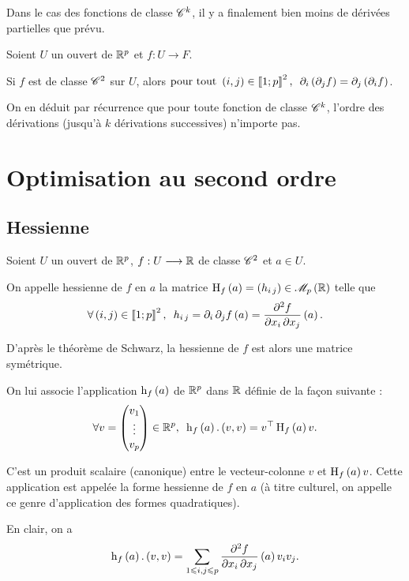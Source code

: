 Dans le cas des fonctions de classe \(\mathscr{C}^{k}\), il y a finalement bien moins de dérivées partielles que prévu.

\begin{theo}
Soient \(U\) un ouvert de \(\mathbb{R}^p\) et \(f:U\to F\).

Si \(f\) est de classe \(\mathscr{C}^{2}\) sur \(U\), alors \(\quantifs{\tpt\paren{i,j}\in\interventierii{1}{p}^2}\pdif{i}\paren{\pdif{j}f}=\pdif{j}\paren{\pdif{i}f}\).
\end{theo}

On en déduit par récurrence que pour toute fonction de classe \(\mathscr{C}^{k}\), l'ordre des dérivations (jusqu'à \(k\) dérivations successives) n'importe pas.

\section{Optimisation au second ordre}

\subsection{Hessienne}

\begin{defi}
Soient \(U\) un ouvert de \(\mathbb{R}^p\), \(f:U\longrightarrow\mathbb{R}\) de classe \(\mathscr{C}^{2}\) et \(a\in U\).

On appelle hessienne de \(f\) en \(a\) la matrice \(\hessienne{f}\paren{a}=\paren{h_{i\,j}}\in\M{p}[\R]\) telle que \[\quantifs{\forall\paren{i,j}\in\interventierii{1}{p}^2}h_{i\,j}=\pdif{i}\pdif{j}f\paren{a}=\pdv{f}{x_i,x_j}\paren{a}.\]
\end{defi}

D'après le théorème de Schwarz, la hessienne de \(f\) est alors une matrice symétrique.


On lui associe l'application \(\operatorname{h}_{f}\left(a\right)\) de \(\mathbb{R}^p\) dans \(\mathbb{R}\) définie de la façon suivante : \[\quantifs{\forall v=\tcoords{v_1}{\vdots}{v_p}\in\R^p}\formehessienne{f}\paren{a}.\paren{v,v}=\trans{v}\hessienne{f}\paren{a}v.\]

C'est un produit scalaire (canonique) entre le vecteur-colonne \(v\) et \(\operatorname{H}_{f}\left(a\right)v\). Cette application est appelée la forme hessienne de \(f\) en \(a\) (à titre culturel, on appelle ce genre d'application des formes quadratiques).

En clair, on a \[\operatorname{h}_{f}\left(a\right).\left(v,v\right)=\sum_{1\leqslant i,j\leqslant p}\pdv{f}{x_i,x_j}\left(a\right)v_iv_j.\]

